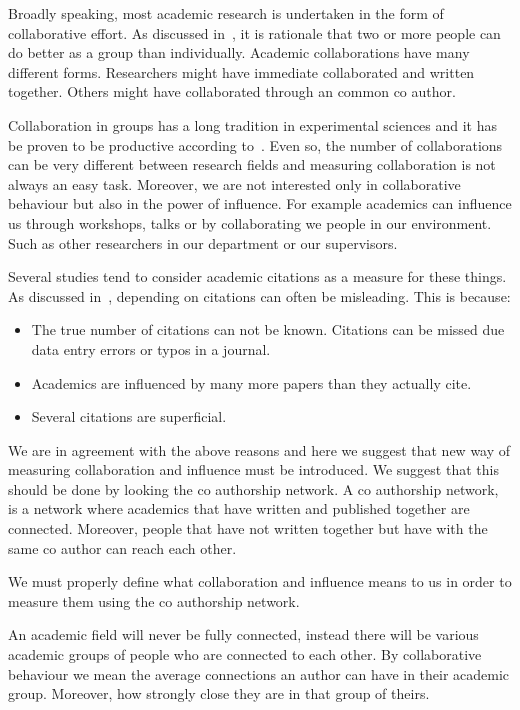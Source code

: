 \documentclass{article}
\theoremstyle{definition}
\begin{document}
Broadly speaking, most academic research is undertaken in the form of
collaborative effort. As discussed in~\cite{}, it is rationale that two
or more people can do better as a group than individually. Academic collaborations
have many different forms. Researchers might have immediate collaborated and
written together. Others might have collaborated through an common co author.

Collaboration in groups has a long tradition in experimental sciences and it has
be proven to be productive according to~\cite{}. Even so, the number of collaborations
can be very different between research fields and measuring collaboration is
not always an easy task. Moreover, we are not interested only in collaborative
behaviour but also in the power of influence. For example academics can influence
us through workshops, talks or by collaborating we people in our environment.
Such as other researchers in our department or our supervisors.

Several studies tend to consider academic citations as a measure for these things.
As discussed in~\cite{nature_blog}, depending on citations can often be misleading.
This is because:

\begin{itemize}
    \item The true number of citations can not be known. Citations can be missed
    due data entry errors or typos in a journal.
    \item Academics are influenced by many more papers than they actually cite.
    \item Several citations are superficial.
\end{itemize}

We are in agreement with the above reasons and here we suggest that new way of
measuring collaboration and influence must be introduced. We suggest that this
should be done by looking the co authorship network. A co authorship network,
is a network where academics that have written and published together are connected.
Moreover, people that have not written together but have with the same co author
can reach each other.

We must properly define what collaboration and influence means to us in order to
measure them using the co authorship network.

An academic field will never be fully connected, instead there will be various
academic groups of people who are connected to each other. By collaborative
behaviour we mean the average connections an author can have in their academic
group. Moreover, how strongly close they are in that group of theirs.
\end{document}
